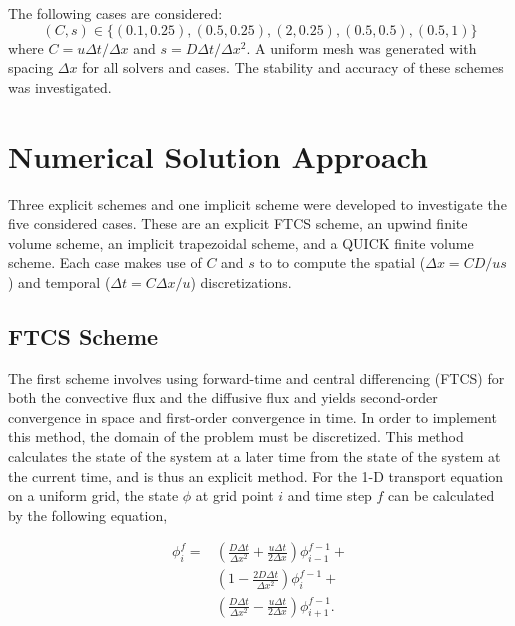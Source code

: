 \documentclass[twocolumn,10pt]{asme2ej}
\begin{document}
The following cases are considered:
\begin{equation*}
(C, s) \in \{(0.1, 0.25), (0.5, 0.25), (2, 0.25), (0.5, 0.5), (0.5, 1)\}
\end{equation*}
\noindent where $C = u\Delta t/\Delta x$ and $s = D\Delta t/\Delta x^2$. A uniform mesh was generated with spacing $\Delta x$ for all solvers and cases. The stability and accuracy of these schemes was investigated.

\section{Numerical Solution Approach}

Three explicit schemes and one implicit scheme were developed to investigate the five considered cases. These are an explicit FTCS scheme, an upwind finite volume scheme, an implicit trapezoidal scheme, and a QUICK finite volume scheme. Each case makes use of $C$ and $s$ to to compute the spatial ($\Delta x = C D / u s$) and temporal ($\Delta t = C \Delta x / u$) discretizations.

\subsection{FTCS Scheme}
The first scheme involves using forward-time and central differencing (FTCS) for both the convective flux and the diffusive flux and yields second-order convergence in space and first-order convergence in time. In order to implement this method, the domain of the problem must be discretized. This method calculates the state of the system at a later time from the state of the system at the current time, and is thus an explicit method. For the 1-D transport equation on a uniform grid, the state $\phi$ at grid point $i$ and time step $f$ can be calculated by the following equation,

\begin{equation}
\label{ftcs_eqn}
\begin{split}
\phi_i ^f = & \left(\frac{D \Delta t}{\Delta x^2} + \frac{u \Delta t}{2 \Delta x}\right) \phi_{i-1} ^{f-1} + \\
            & \left(1-\frac{2 D\Delta t}{\Delta x^2}\right) \phi_i ^{f-1} + \\
            & \left(\frac{D \Delta t}{\Delta x^2} - \frac{u \Delta t}{2 \Delta x}\right) \phi_{i+1} ^{f-1}.
\end{split}
\end{equation}
\end{document}
